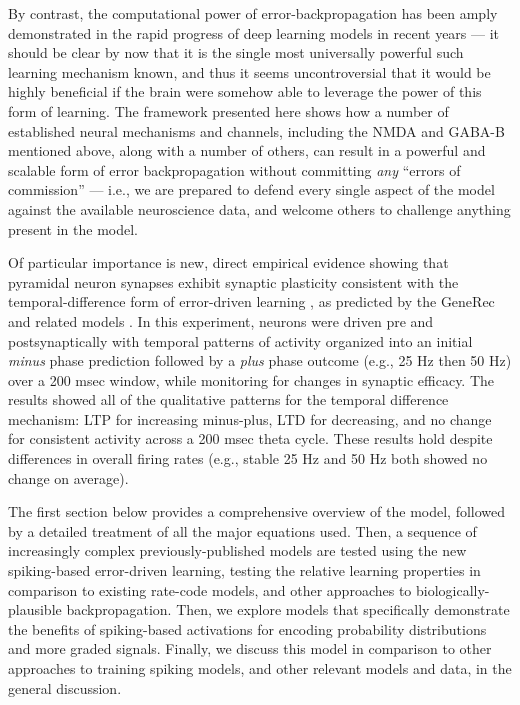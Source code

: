 \documentclass[11pt,twoside]{article}
\newif\myifpdf
\begin{document}
By contrast, the computational power of error-backpropagation has been amply demonstrated in the rapid progress of deep learning models in recent years --- it should be clear by now that it is the single most universally powerful such learning mechanism known, and thus it seems uncontroversial that it would be highly beneficial if the brain were somehow able to leverage the power of this form of learning.  The framework presented here shows how a number of established neural mechanisms and channels, including the NMDA and GABA-B mentioned above, along with a number of others, can result in a powerful and scalable form of error backpropagation without committing {\em any} ``errors of commission'' --- i.e., we are prepared to defend every single aspect of the model against the available neuroscience data, and welcome others to challenge anything present in the model.

Of particular importance is new, direct empirical evidence showing that pyramidal neuron synapses exhibit synaptic plasticity consistent with the temporal-difference form of error-driven learning \citep{JangZitoOReilly22}, as predicted by the GeneRec and related models \citep{OReilly96}.  In this experiment, neurons were driven pre and postsynaptically with temporal patterns of activity organized into an initial {\em minus} phase prediction followed by a {\em plus} phase outcome (e.g., 25 Hz then 50 Hz) over a 200 msec window, while monitoring for changes in synaptic efficacy. The results showed all of the qualitative patterns for the temporal difference mechanism: LTP for increasing minus-plus, LTD for decreasing, and no change for consistent activity across a 200 msec theta cycle. These results hold despite differences in overall firing rates (e.g., stable 25 Hz and 50 Hz both showed no change on average).


The first section below provides a comprehensive overview of the model, followed by a detailed treatment of all the major equations used.  Then, a sequence of increasingly complex previously-published models are tested using the new spiking-based error-driven learning, testing the relative learning properties in comparison to existing rate-code models, and other approaches to biologically-plausible backpropagation.  Then, we explore models that specifically demonstrate the benefits of spiking-based activations for encoding probability distributions and more graded signals.  Finally, we discuss this model in comparison to other approaches to training spiking models, and other relevant models and data, in the general discussion.
\end{document}
